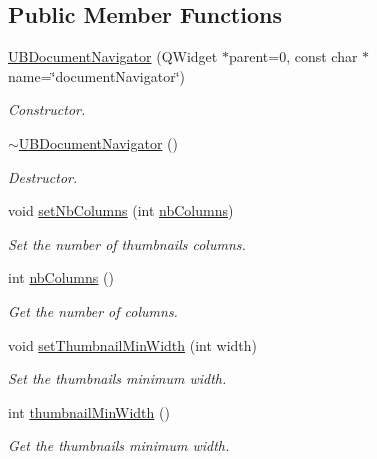 \subsection*{Public Member Functions}
\begin{DoxyCompactItemize}
\item 
\hyperlink{class_u_b_document_navigator_a6f5bd3d8c43ad063b094245113fa0b9b}{U\-B\-Document\-Navigator} (Q\-Widget $\ast$parent=0, const char $\ast$name=\char`\"{}document\-Navigator\char`\"{})
\begin{DoxyCompactList}\small\item\em Constructor. \end{DoxyCompactList}\item 
\hyperlink{class_u_b_document_navigator_a2e01b56c370b95e7aa88372721454831}{$\sim$\-U\-B\-Document\-Navigator} ()
\begin{DoxyCompactList}\small\item\em Destructor. \end{DoxyCompactList}\item 
void \hyperlink{class_u_b_document_navigator_ac886247172160377505e692dce421ce3}{set\-Nb\-Columns} (int \hyperlink{class_u_b_document_navigator_af3fe4f59d6a1b642c72f45646a29359b}{nb\-Columns})
\begin{DoxyCompactList}\small\item\em Set the number of thumbnails columns. \end{DoxyCompactList}\item 
int \hyperlink{class_u_b_document_navigator_af3fe4f59d6a1b642c72f45646a29359b}{nb\-Columns} ()
\begin{DoxyCompactList}\small\item\em Get the number of columns. \end{DoxyCompactList}\item 
void \hyperlink{class_u_b_document_navigator_a4fa0a7317bcc878173c7d81ee116b7ed}{set\-Thumbnail\-Min\-Width} (int width)
\begin{DoxyCompactList}\small\item\em Set the thumbnails minimum width. \end{DoxyCompactList}\item 
int \hyperlink{class_u_b_document_navigator_a0bfaf195f95afd04bc0c85db8fd86c55}{thumbnail\-Min\-Width} ()
\begin{DoxyCompactList}\small\item\em Get the thumbnails minimum width. \end{DoxyCompactList}\end{DoxyCompactItemize}
